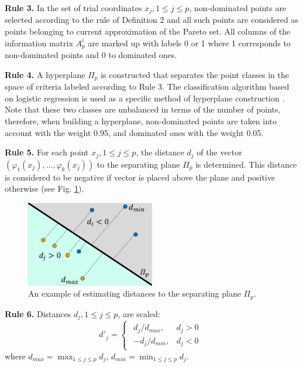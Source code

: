\documentclass[runningheads]{llncs}
\begin{document}
\textbf{Rule 3.} In the set of trial coordinates $x_j, 1 \leq j \leq p$, non-dominated points are selected according to the rule of Definition 2 and all such points are considered as points belonging to current approximation of the Pareto set. All columns of the information matrix $A^i_p$ are marked up with labels 0 or 1 where 1 corresponds to non-dominated points and 0 to dominated ones.

\textbf{Rule 4.} A hyperplane $\Pi_p$ is constructed that separates the point classes in the space of criteria labeled according to Rule 3. The classification algorithm based on logistic regression is used as a specific method of hyperplane construction \cite{Yu2011}. Note that these two classes are unbalanced in terms of the number of points, therefore, when building a hyperplane, non-dominated points are taken into account with the weight 0.95, and dominated ones with the weight 0.05.

\textbf{Rule 5.} For each point $x_j, 1 \leq j \leq p$, the distance $d_j$ of the vector $(\varphi_1(x_j), \dots, \varphi_k(x_j))$ to the separating plane $\Pi_p$ is determined. This distance is considered to be negative if vector is placed above the plane and positive otherwise (see Fig. \ref{fig:1}).

\begin{figure}
\centering
\includegraphics[width=0.5\textwidth]{fig1}
\caption{An example of estimating distances to the separating plane $\Pi_p$.} \label{fig:1}
\end{figure}

\textbf{Rule 6.} Distances $d_j, 1 \leq j \leq p$, are scaled:     
\begin{equation}
    \label{eq:23}
d'_j=
\begin{cases}
  \begin{matrix}
     d_j / d_{max}, & d_j > 0 \\
     -d_j / d_{min}, & d_j < 0 
  \end{matrix}
\end{cases}
\end{equation}
where $d_{max} = \max_{1 \leq j \leq p} {d_j}$, $d_{min} = \min_{1 \leq j \leq p} {d_j}$.    
\end{document}
